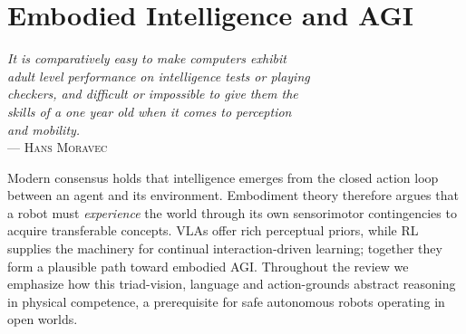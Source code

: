 \section{Embodied Intelligence and AGI}


\begin{flushright}{\slshape    
    \textit{It is comparatively easy to make computers exhibit \\
    adult level performance on intelligence tests or playing \\
    checkers, and difficult or impossible to give them the \\
    skills of a one year old when it comes to perception \\
    and mobility.}} \\ \medskip
    --- \textsc{Hans Moravec} \cite{MORAVEC1988}
\end{flushright}

Modern consensus holds that intelligence emerges from the closed action loop between an agent and its environment. Embodiment theory therefore argues that a robot must \emph{experience} the world through its own sensorimotor contingencies to acquire transferable concepts. \acp{VLA} offer rich perceptual priors, while \ac{RL} supplies the machinery for continual interaction‑driven learning; together they form a plausible path toward embodied \ac{AGI}.  Throughout the review we emphasize how this triad-vision, language and action-grounds abstract reasoning in physical competence, a prerequisite for safe autonomous robots operating in open worlds.

